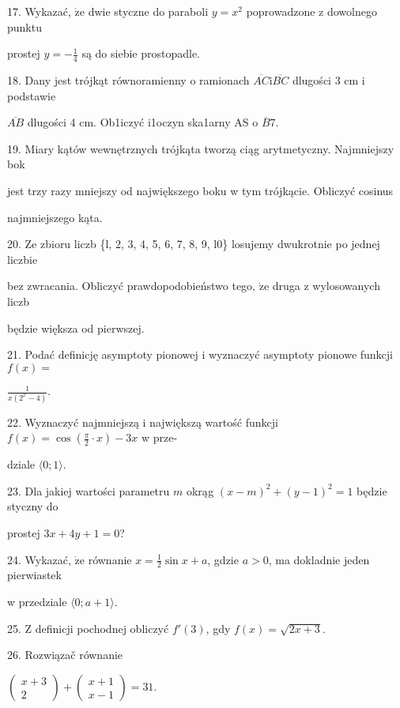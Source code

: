 \documentclass[a4paper,12pt]{article}
\begin{document}
17. Wykazać, $\dot{\mathrm{z}}\mathrm{e}$ dwie styczne do paraboli $y=x^{2}$ poprowadzone z dowolnego punktu

prostej $y=-\displaystyle \frac{1}{4}$ są do siebie prostopadle.

18. Dany jest trójkąt równoramienny o ramionach $\overline{AC}\mathrm{i}\overline{BC}$ dlugości 3 cm i podstawie

$\overline{AB}$ dlugości 4 cm. Ob1iczyć i1oczyn ska1arny AS o $\overline{B}7.$

19. Miary kątów wewnętrznych trójkąta tworzą ciąg arytmetyczny. Najmniejszy bok

jest trzy razy mniejszy od największego boku w tym trójkącie. Obliczyć cosinus

najmniejszego kąta.

20. Ze zbioru liczb \{l, 2, 3, 4, 5, 6, 7, 8, 9, l0\} losujemy dwukrotnie po jednej liczbie

bez zwracania. Obliczyć prawdopodobieństwo tego, $\dot{\mathrm{z}}\mathrm{e}$ druga z wylosowanych liczb

będzie większa od pierwszej.

21. Podać definicję asymptoty pionowej i wyznaczyć asymptoty pionowe funkcji $f(x)=$

$\displaystyle \frac{1}{x(2^{x}-4)}.$

22. Wyznaczyć najmniejszą i największą wartość funkcji $f(x)=\displaystyle \cos(\frac{\pi}{2}\cdot x)-3x$ w prze-

dziale $\langle 0;1\rangle.$

23. Dla jakiej wartości parametru $m$ okrąg $(x-m)^{2}+(y-1)^{2}=1$ będzie styczny do

prostej $3x+4y+1=0$?

24. Wykazać, $\dot{\mathrm{z}}\mathrm{e}$ równanie $x=\displaystyle \frac{1}{2}\sin x+a$, gdzie $a>0$, ma dokladnie jeden pierwiastek

w przedziale $\langle 0;a+1\rangle.$

25. $\mathrm{Z}$ definicji pochodnej obliczyć $f'(3)$, gdy $f(x)=\sqrt{2x+3}.$

26. Rozwiązač równanie

$\left(\begin{array}{l}
x+3\\
2
\end{array}\right)+\left(\begin{array}{l}
x+1\\
x-1
\end{array}\right)=31.$
\end{document}
